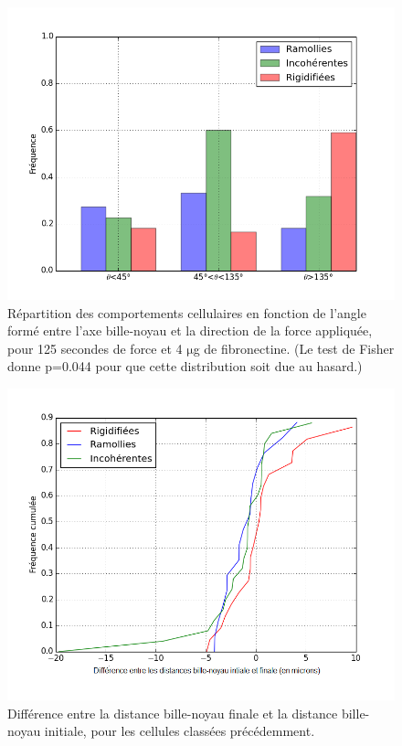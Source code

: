 \documentclass{report}
\newcommand{\micro}{$\mathrm{\mu}$}
\begin{document}
\begin{figure}[p]
\includegraphics[scale=0.45]{Figures/Hist_Angles.png} 
\caption{Répartition des comportements cellulaires en fonction de l'angle formé entre l'axe bille-noyau et la direction de la force appliquée, pour 125 secondes de force et 4 \micro g de fibronectine. (Le test de Fisher donne p=0.044 pour que cette distribution soit due au hasard.) \label{Angle_C4}}
\end{figure}
\begin{figure}[p]
\includegraphics[scale=0.45]{Figures/Evolution_DBN.png}
\caption{Différence entre la distance bille-noyau finale et la distance bille-noyau initiale, pour les cellules classées précédemment. \label{DBN}}
\end{figure}
\end{document}
